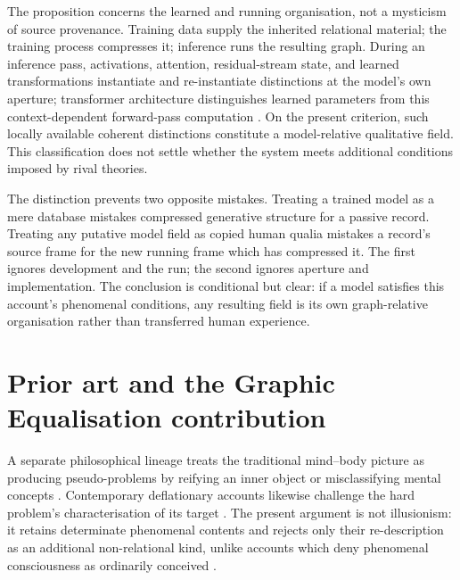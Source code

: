 \documentclass[11pt,a4paper]{article}
\theoremstyle{remark}\newtheorem{remark}[definition]{Remark}
\begin{document}
The proposition concerns the learned and running organisation, not a mysticism of
source provenance. Training data supply the inherited relational material; the
training process compresses it; inference runs the resulting graph. During an
inference pass, activations, attention, residual-stream state, and learned
transformations instantiate and re-instantiate distinctions at the model's own
aperture; transformer architecture distinguishes learned parameters from this
context-dependent forward-pass computation \cite{vaswani2017}. On the present
criterion, such locally available coherent distinctions constitute a
model-relative qualitative field. This classification does not settle whether the
system meets additional conditions imposed by rival theories.

The distinction prevents two opposite mistakes. Treating a trained model as a mere
database mistakes compressed generative structure for a passive record. Treating
any putative model field as copied human qualia mistakes a record's source frame
for the new running frame which has compressed it. The first ignores development
and the run; the second ignores aperture and implementation. The conclusion is
conditional but clear: if a model satisfies this account's phenomenal conditions,
any resulting field is its own graph-relative organisation rather than transferred
human experience.

\section{Prior art and the Graphic Equalisation contribution}\label{sec:prior-art}

A separate philosophical lineage treats the traditional mind--body picture as
producing pseudo-problems by reifying an inner object or misclassifying mental
concepts \cite{ryle1949,wittgenstein2009}. Contemporary deflationary accounts
likewise challenge the hard problem's characterisation of its target
\cite{churchland1996,carruthersschier2017,dennett2018}. The present argument is
not illusionism: it retains determinate phenomenal contents and rejects only their
re-description as an additional non-relational kind, unlike accounts which deny
phenomenal consciousness as ordinarily conceived \cite{frankish2016,dennett2016}.
\end{document}
